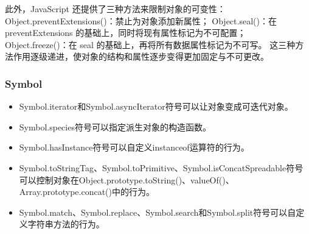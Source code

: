 此外，JavaScript 还提供了三种方法来限制对象的可变性：
Object.preventExtensions()：禁止为对象添加新属性；
Object.seal()：在 preventExtensions 的基础上，同时将现有属性标记为不可配置；
Object.freeze()：在 seal 的基础上，再将所有数据属性标记为不可写。
这三种方法作用逐级递进，使对象的结构和属性逐步变得更加固定与不可更改。

\subsubsection{Symbol}
\begin{itemize}
	\item Symbol.iterator和Symbol.asyncIterator符号可以让对象变成可迭代对象。
	\item Symbol.species符号可以指定派生对象的构造函数。
	\item Symbol.hasInstance符号可以自定义instanceof运算符的行为。
	\item Symbol.toStringTag、Symbol.toPrimitive、Symbol.isConcatSpreadable符号可以控制对象在Object.prototype.toString()、valueOf()、Array.prototype.concat()中的行为。
	\item Symbol.match、Symbol.replace、Symbol.search和Symbol.split符号可以自定义字符串方法的行为。
\end{itemize}

